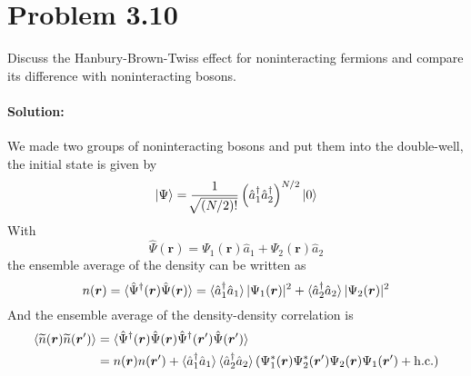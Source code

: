 \section*{Problem 3.10}
Discuss the Hanbury-Brown-Twiss effect for noninteracting fermions and compare its difference with noninteracting bosons.
\paragraph*{Solution:}
We made two groups of noninteracting bosons and put them into the double-well, the initial state is given by 
\begin{equation}
    \ket{\Psi} = \frac{1}{\sqrt[]{(N/2)!}} \left(\hat{a}^{\dagger}_1 \hat{a}^{\dagger}_2\right)^{N/2} \ket{0} 
\end{equation}
With 
\begin{equation}
    \hat{\Psi}(\bm{r}) = \Psi_1(\bm{r}) \hat{a}_1 + \Psi_2(\bm{r}) \hat{a}_2
\end{equation}
the ensemble average of the density can be written as 
\begin{equation}
    n(\bm{r}) 
    = \braket{\hat{\Psi}^{\dagger}(\bm{r}) \hat{\Psi}(\bm{r})} 
    = \braket{\hat{a}^{\dagger}_1 \hat{a}_1} |\Psi_1(\bm{r})|^2
    + \braket{\hat{a}^{\dagger}_2 \hat{a}_2} |\Psi_2(\bm{r})|^2
\end{equation}
And the ensemble average of the density-density correlation is 
\begin{equation}
    \begin{aligned}
        \braket{\widetilde{n}(\bm{r}) \widetilde{n}(\bm{r}') } 
        &= \braket{\hat{\Psi}^{\dagger}(\bm{r}) \hat{\Psi}(\bm{r})\hat{\Psi}^{\dagger}(\bm{r}')\hat{\Psi}(\bm{r}')} \\
        &= n(\bm{r})n(\bm{r}') 
        + \braket{\hat{a}^{\dagger}_1 \hat{a}_1} \braket{\hat{a}^{\dagger}_2 \hat{a}_2} 
        \left(\Psi^*_1(\bm{r})\Psi^*_2(\bm{r}')\Psi_2(\bm{r})\Psi_1(\bm{r}')  + \mathrm{h.c.} \right)
    \end{aligned}
\end{equation}

